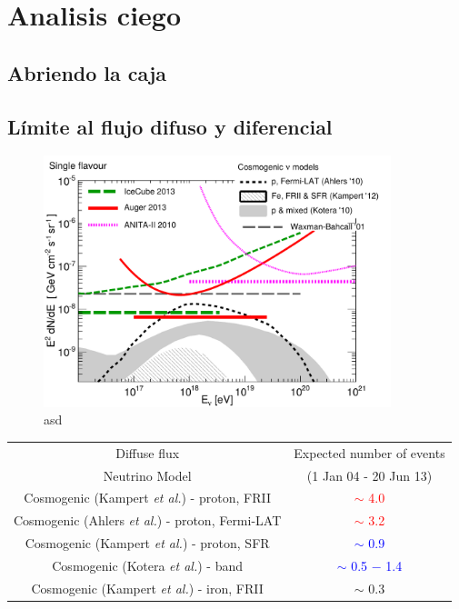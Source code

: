 \section{Analisis ciego}

	\subsection{Abriendo la caja}
	
	\subsection{L\'imite al flujo difuso y diferencial}
	\begin{figure}[h!]
		\begin{center}
			\includegraphics[width=0.9\textwidth]{fig/resultadosAuger/limits_combined_ageing}
			\caption{asd}
			\label{fig:}
		\end{center}
	\end{figure}
	
	\begin{table}[h!]
		\begin{center}
		\renewcommand{\arraystretch}{2.0}
			\begin{tabular}{|c|c|} 
			\hline
			Diffuse flux       &  Expected number of events   \\
			Neutrino Model     &  (1 Jan 04 - 20 Jun 13)   \\
			\hline
			\hline
			Cosmogenic (Kampert {\it et al.}) - proton, FRII      &  \textcolor{Red}{$\sim$ 4.0}  \\
			\hline
			Cosmogenic (Ahlers {\it et al.}) - proton, Fermi-LAT  &  \textcolor{Red}{$\sim$ 3.2}  \\
			\hline
			Cosmogenic (Kampert {\it et al.}) - proton, SFR       &  \textcolor{Blue}{$\sim$ 0.9}  \\
			\hline
			Cosmogenic (Kotera {\it et al.}) - band               &  \textcolor{Blue}{$\sim$ 0.5 $-$ 1.4}  \\
			\hline
			Cosmogenic (Kampert {\it et al.}) - iron, FRII        &  $\sim$ 0.3  \\
			\hline
			\end{tabular}
		\end{center}
	\end{table}
	

